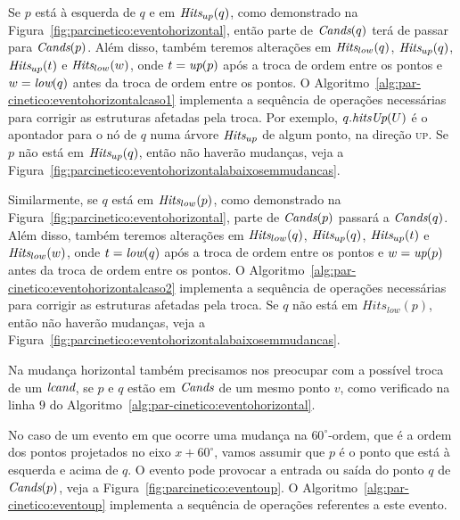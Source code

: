 

Se $p$ está à esquerda de $q$ e em $\textit{Hits}_{up}(q)$, como demonstrado na
Figura~\ref{fig:parcinetico:eventohorizontal}, então parte de $\textit{Cands}(q)$ terá de passar
para $\textit{Cands}(p)$.
Além disso, também teremos alterações em $\textit{Hits}_{low}(q)$, $\textit{Hits}_{up}(q)$, $\textit{Hits}_{up}(t)$ e
$\textit{Hits}_{low}(w)$, onde $t = \textit{up}(p)$ após a troca de ordem entre os pontos e $w = \textit{low}(q)$ antes da
troca de ordem entre os pontos.
O Algoritmo~\ref{alg:par-cinetico:eventohorizontalcaso1} implementa a sequência de operações
necessárias para corrigir as estruturas afetadas pela troca.
Por exemplo, $q.\textit{hitsUp}(U)$ é o apontador para o nó de $q$ numa árvore $\textit{Hits}_{up}$ de algum
ponto, na direção \textsc{up}.
Se $p$ não está em $\textit{Hits}_{up}(q)$, então não haverão mudanças, veja a
Figura~\ref{fig:parcinetico:eventohorizontalabaixosemmudancas}.

Similarmente, se $q$ está em $\textit{Hits}_{low}(p)$, como demonstrado na
Figura~\ref{fig:parcinetico:eventohorizontal}, parte de $\textit{Cands}(p)$ passará a $\textit{Cands}(q)$.
Além disso, também teremos alterações em $\textit{Hits}_{low}(q)$, $\textit{Hits}_{up}(q)$, $\textit{Hits}_{up}(t)$ e
$\textit{Hits}_{low}(w)$, onde $t = \textit{low}(q)$ após a troca de ordem entre os pontos e $w = \textit{up}(p)$ antes da
troca de ordem entre os pontos.
O Algoritmo~\ref{alg:par-cinetico:eventohorizontalcaso2} implementa a sequência de operações
necessárias para corrigir as estruturas afetadas pela troca.
Se $q$ não está em $Hits_{low}(p)$, então não haverão mudanças, veja a
Figura~\ref{fig:parcinetico:eventohorizontalabaixosemmudancas}.







Na mudança horizontal também precisamos nos preocupar com a possível troca de um
$\textit{lcand}$, se $p$ e $q$ estão em $\textit{Cands}$ de um mesmo ponto $v$, como verificado na linha $9$ do
Algoritmo~\ref{alg:par-cinetico:eventohorizontal}.





No caso de um evento em que ocorre uma mudança na $60^\circ$-ordem, que é a ordem dos pontos
projetados no eixo $x + 60^\circ$, vamos assumir que $p$ é o ponto que está à esquerda e acima de $q$.
O evento pode provocar a entrada ou saída do ponto $q$ de $\textit{Cands}(p)$, veja a
Figura~\ref{fig:parcinetico:eventoup}.
O Algoritmo~\ref{alg:par-cinetico:eventoup} implementa a sequência de operações referentes a este
evento.

